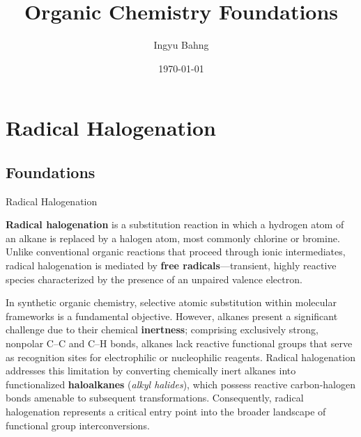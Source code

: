 \documentclass[10pt]{article}
\title{Organic Chemistry Foundations}
\date{\today}
\author{Ingyu Bahng}
\begin{document}


\section{Radical Halogenation}
  \label{sec:rad_halo}

  \subsection{Foundations}
    \label{sec:foundations}

    \begin{core}{Radical Halogenation}

      \textbf{Radical halogenation} is a substitution reaction in which a hydrogen atom of an alkane is replaced by a halogen atom, most commonly chlorine or bromine. Unlike conventional organic reactions that proceed through ionic intermediates, radical halogenation is mediated by \textbf{free radicals}---transient, highly reactive species characterized by the presence of an unpaired valence electron.

      In synthetic organic chemistry, selective atomic substitution within molecular frameworks is a fundamental objective. However, alkanes present a significant challenge due to their chemical \textbf{inertness}; comprising exclusively strong, nonpolar C--C and C--H bonds, alkanes lack reactive functional groups that serve as recognition sites for electrophilic or nucleophilic reagents. Radical halogenation addresses this limitation by converting chemically inert alkanes into functionalized \textbf{haloalkanes} (\textit{alkyl halides}), which possess reactive carbon-halogen bonds amenable to subsequent transformations. Consequently, radical halogenation represents a critical entry point into the broader landscape of functional group interconversions.

    \end{core}
\end{document}
